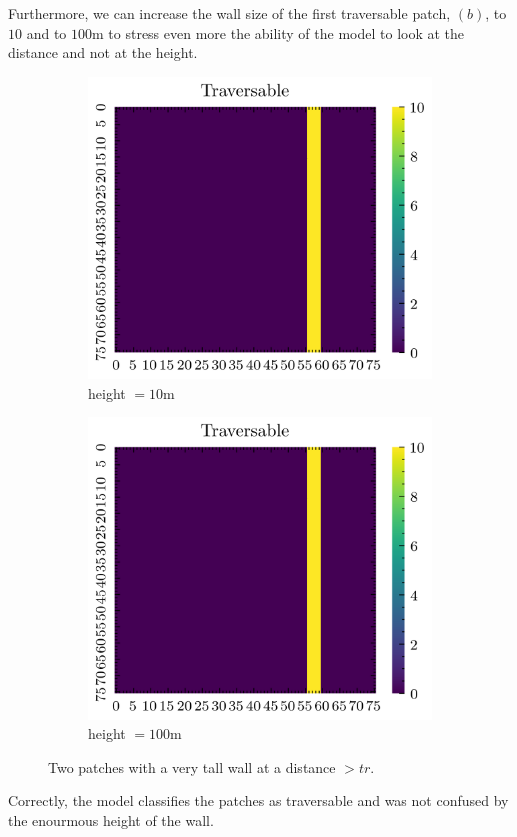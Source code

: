 \documentclass[../document.tex]{subfiles}
\begin{document}
Furthermore, we can increase the wall size of the first traversable patch, $(b)$, to $10$ and to $100$m to stress even more the ability of the model to look at the distance and not at the height.

\begin{figure}[H]
    \centering
    \begin{subfigure}[b]{0.33\textwidth}
        \includegraphics[width=\linewidth]{../img/5/custom_patches/walls_front/big-1-2d.png}
    \caption{height $=10$m}
    \end{subfigure}   
    \begin{subfigure}[b]{0.33\textwidth}
        \includegraphics[width=\linewidth]{../img/5/custom_patches/walls_front/big-1-2d.png}
        \caption{height $=100$m}
    \end{subfigure}   
\caption{Two patches with a very tall wall at a distance $> tr$.}    
\end{figure}
Correctly, the model classifies the patches as traversable and was not confused by the enourmous height of the wall.
\end{document}
